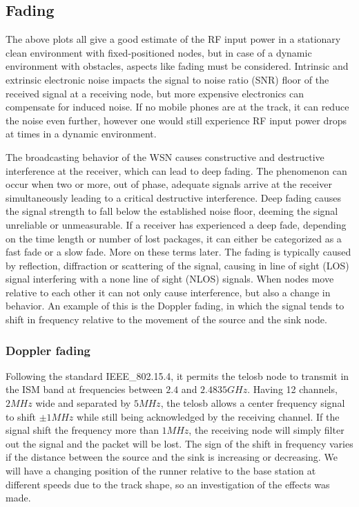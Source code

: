 \subsection{Fading}\label{sc:fading}

The above plots all give a good estimate of the RF input power in a stationary clean environment with fixed-positioned nodes, but in case of a dynamic environment with obstacles, aspects like fading must be considered. Intrinsic and extrinsic electronic noise impacts the signal to noise ratio (SNR) floor of the received signal at a receiving node, but more expensive electronics can compensate for induced noise. If no mobile phones are at the track, it can reduce the noise even further, however one would still 
experience RF input power drops at times in a dynamic environment.

\noindent The broadcasting behavior of the WSN causes constructive and destructive interference at the receiver, which can lead to deep fading. The phenomenon can occur when two or more, out of phase, adequate signals arrive at the receiver simultaneously leading to a critical destructive interference. Deep fading causes the signal strength to fall below the established noise floor, deeming the signal unreliable or unmeasurable. If a receiver has experienced a deep fade, depending on the time length or number of lost packages, it can either be categorized as a fast fade or a slow fade. More on these terms later. The fading is typically caused by reflection, diffraction or scattering of the signal, causing in line of sight (LOS) signal interfering with a none line of sight (NLOS) signals. When nodes move relative to each other it can not only cause interference, but also a change in behavior. An example of this is the Doppler fading, in which the signal tends to shift in frequency relative to the movement of the source and the sink node.

\subsubsection{Doppler fading}
Following the standard IEEE\_802.15.4, it permits the telosb node to transmit in the ISM band at frequencies between $2.4$ and $2.4835 GHz$. Having 12 channels, $2 MHz$ wide and separated by $5 MHz$, the telosb allows a center frequency signal to shift $\pm 1 MHz$ while still being acknowledged by the receiving channel. If the signal shift the frequency more than $1 MHz$, the receiving node will simply filter out the signal and the packet will be lost. The sign of the shift in frequency varies if the distance between the source and the sink is increasing or decreasing. We will have a changing position of the runner relative to the base station at different speeds due to the track shape, so an investigation of the effects was made.

